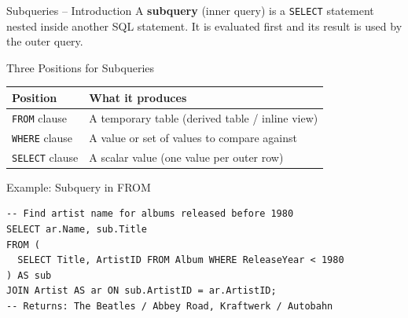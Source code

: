 \begin{frame}[fragile]{Subqueries -- Introduction}
  A \textbf{subquery} (inner query) is a \texttt{SELECT} statement nested inside
  another SQL statement. It is evaluated first and its result is used by the outer query.

  \begin{block}{Three Positions for Subqueries}
    \begin{tabular}{@{}ll@{}}
      \toprule
      \textbf{Position} & \textbf{What it produces} \\
      \midrule
      \texttt{FROM} clause   & A temporary table (derived table / inline view) \\
      \texttt{WHERE} clause  & A value or set of values to compare against \\
      \texttt{SELECT} clause & A scalar value (one value per outer row) \\
      \bottomrule
    \end{tabular}
  \end{block}

  \begin{block}{Example: Subquery in FROM}
\begin{lstlisting}[style=sqlstyle]
-- Find artist name for albums released before 1980
SELECT ar.Name, sub.Title
FROM (
  SELECT Title, ArtistID FROM Album WHERE ReleaseYear < 1980
) AS sub
JOIN Artist AS ar ON sub.ArtistID = ar.ArtistID;
-- Returns: The Beatles / Abbey Road, Kraftwerk / Autobahn
\end{lstlisting}
  \end{block}
\end{frame}

